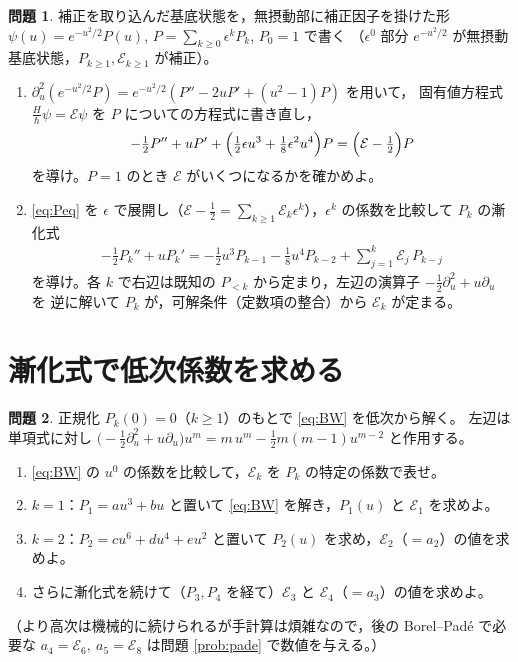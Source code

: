 \documentclass[dvipdfmx, uplatex]{jsarticle}
\newcommand{\hb}{\hbar}
\newcommand{\cE}{\mathcal{E}}
\theoremstyle{definition}
\newtheorem{prob}{問題}
\begin{document}
\begin{prob}\label{prob:bw}
補正を取り込んだ基底状態を，無摂動部に補正因子を掛けた形
$\psi(u)=e^{-u^2/2}P(u)$, $P=\sum_{k\ge0}\epsilon^kP_k$, $P_0=1$ で書く
（$\epsilon^0$ 部分 $e^{-u^2/2}$ が無摂動基底状態，$P_{k\ge1},\cE_{k\ge1}$ が補正）。
\begin{enumerate}
\item $\partial_u^2(e^{-u^2/2}P)=e^{-u^2/2}(P''-2uP'+(u^2-1)P)$ を用いて，
固有値方程式 $\frac{H}{\hb}\psi=\cE\psi$ を $P$ についての方程式に書き直し，
\begin{align}
    -\tfrac12 P''+uP'+\Bigl(\tfrac12\epsilon u^3+\tfrac18\epsilon^2 u^4\Bigr)P=\Bigl(\cE-\tfrac12\Bigr)P
\label{eq:Peq}
\end{align}
を導け。$P=1$ のとき $\cE$ がいくつになるかを確かめよ。
\item \eqref{eq:Peq} を $\epsilon$ で展開し（$\cE-\tfrac12=\sum_{k\ge1}\cE_k\epsilon^k$），$\epsilon^k$ の係数を比較して
$P_k$ の漸化式
\begin{align}
    -\tfrac12 P_k''+uP_k'=-\tfrac12 u^3 P_{k-1}-\tfrac18 u^4 P_{k-2}+\sum_{j=1}^{k}\cE_j\,P_{k-j}
\label{eq:BW}
\end{align}
を導け。各 $k$ で右辺は既知の $P_{<k}$ から定まり，左辺の演算子 $-\tfrac12\partial_u^2+u\partial_u$ を
逆に解いて $P_k$ が，可解条件（定数項の整合）から $\cE_k$ が定まる。
\end{enumerate}
\end{prob}

\section{漸化式で低次係数を求める}

\begin{prob}\label{prob:gen}
正規化 $P_k(0)=0$（$k\ge1$）のもとで \eqref{eq:BW} を低次から解く。
左辺は単項式に対し $\bigl(-\tfrac12\partial_u^2+u\partial_u\bigr)u^m=m\,u^m-\tfrac12 m(m-1)u^{m-2}$ と作用する。
\begin{enumerate}
\item \eqref{eq:BW} の $u^0$ の係数を比較して，$\cE_k$ を $P_k$ の特定の係数で表せ。
\item $k=1$：$P_1=au^3+bu$ と置いて \eqref{eq:BW} を解き，$P_1(u)$ と $\cE_1$ を求めよ。
\item $k=2$：$P_2=cu^6+du^4+eu^2$ と置いて $P_2(u)$ を求め，$\cE_2$（$=a_2$）の値を求めよ。
\item さらに漸化式を続けて（$P_3,P_4$ を経て）$\cE_3$ と $\cE_4$（$=a_3$）の値を求めよ。
\end{enumerate}
（より高次は機械的に続けられるが手計算は煩雑なので，後の Borel--Pad\'e で必要な
$a_4=\cE_6,\ a_5=\cE_8$ は問題 \ref{prob:pade} で数値を与える。）
\end{prob}
\end{document}
